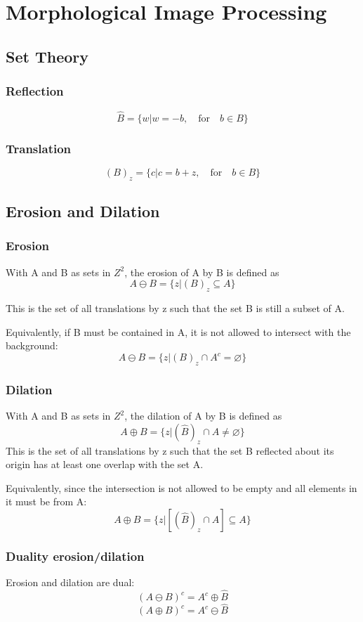 \section{Morphological Image Processing}

\subsection{Set Theory}
\begin{multicols}{2}
\subsubsection{Reflection}
\[
	\hat{B} = \{w | w = -b,\quad \text{for} \quad b \in B \}
\]


\subsubsection{Translation}
\[
	(B)_z = \{ c | c = b + z,\quad \text{for} \quad b \in B\}
\]

\subsection{Erosion and Dilation}
\subsubsection{Erosion}
With A and B as sets in $Z^2$, the erosion of A by B is defined as
\[
	A \ominus B = \{z|(B)_z \subseteq A  \}
\]

This is the set of all translations by z such that the set B is still a subset of A.

Equivalently, if B must be contained in A, it is not allowed to intersect with the background:
\[
	A \ominus B = \{z|(B)_z \cap A^c = \varnothing  \}
\]


\subsubsection{Dilation}
With A and B as sets in $Z^2$, the dilation of A by B is defined as
\[
	A \oplus B = \{z |(\hat{B})_z \cap A \neq \varnothing \}
\]
This is the set of all translations by z such that the set B reflected about its origin has at least one overlap with the set A.

Equivalently, since the intersection is not allowed to be empty and all elements in it must be from A:
\[
	A \oplus B = \{z | [(\hat{B})_z \cap A] \subseteq A \}
\]


\subsubsection{Duality erosion/dilation}
Erosion and dilation are dual:
\[
	(A  \ominus B)^c = A^c \oplus \hat{B}
\]
\[
	(A \oplus B)^c = A^c \ominus \hat{B}
\]

\end{multicols}
